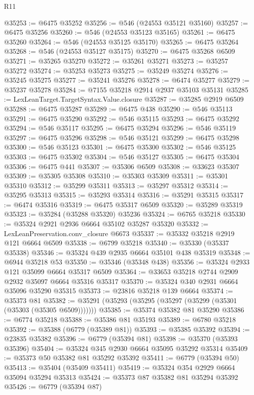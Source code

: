 \begin{lexlean}{R11}
\begin{coremodule}
@35253 := @6475 @35252
@35256 := @546 (@24553 @35121 @35160)
@35257 := @6475 @35256
@35260 := @546 (@24553 @35123 @35165)
@35261 := @6475 @35260
@35264 := @546 (@24553 @35125 @35170)
@35265 := @6475 @35264
@35268 := @546 (@24553 @35127 @35175)
@35270 := @6475 @35268 @6509
@35271 := @35265 @35270
@35272 := @35261 @35271
@35273 := @35257 @35272
@35274 := @35253 @35273
@35275 := @35249 @35274
@35276 := @35245 @35275
@35277 := @35241 @35276
@35278 := @6474 @35277
@35279 := @35237 @35278
@35284 := @7155 @35218 @2914 @2937 @35103 @35131
@35285 := LexLeanTarget.TargetSyntax.Value.closure
@35287 := @35285 @2919 @6509
@35288 := @6475 @35287
@35289 := @6475 @438
@35290 := @546 @35113
@35291 := @6475 @35290
@35292 := @546 @35115
@35293 := @6475 @35292
@35294 := @546 @35117
@35295 := @6475 @35294
@35296 := @546 @35119
@35297 := @6475 @35296
@35298 := @546 @35121
@35299 := @6475 @35298
@35300 := @546 @35123
@35301 := @6475 @35300
@35302 := @546 @35125
@35303 := @6475 @35302
@35304 := @546 @35127
@35305 := @6475 @35304
@35306 := @6475 @441
@35307 := @35306 @6509
@35308 := @33623 @35307
@35309 := @35305 @35308
@35310 := @35303 @35309
@35311 := @35301 @35310
@35312 := @35299 @35311
@35313 := @35297 @35312
@35314 := @35295 @35313
@35315 := @35293 @35314
@35316 := @35291 @35315
@35317 := @6474 @35316
@35319 := @6475 @35317 @6509
@35320 := @35289 @35319
@35323 := @35284 (@35288 @35320) @35236
@35324 := @6765 @35218
@35330 := @35324 @2921 @2936 @6664 @35102 @35287 @35320
@35332 := LexLeanPreservation.conv_closure @6673
@35337 := @35332 @35218 @2919 @121 @6664 @6509
@35338 := @6799 @35218
@35340 := @35330 (@35337 @35338)
@35346 := @35324 @439 @2935 @6664 @35101 @438 @35319
@35348 := @6944 @35218 @53
@35350 := @35346 (@35348 @438)
@35356 := @35324 @2933 @121 @35099 @6664 @35317 @6509
@35364 := @33653 @35218 @2744 @2909 @2932 @35097 @6664 @35316 @35317
@35370 := @35324 @340 @2931 @6664 @35096 @35290 @35315
@35373 := @23816 @35218 @139 @6664
@35374 := @35373 @81
@35382 := @35291 (@35293 (@35295 (@35297 (@35299 (@35301 (@35303 (@35305 @6509)))))))
@35385 := @35374 @35382 @81 @35290
@35386 := @6774 @35218
@35388 := @35386 @81 @35193
@35389 := @6780 @35218
@35392 := @35388 (@6779 (@35389 @81))
@35393 := @35385 @35392
@35394 := @23835 @35382
@35396 := @6779 (@35394 @81)
@35398 := @35370 (@35393 @35396)
@35404 := @35324 @345 @2930 @6664 @35095 @35292 @35314
@35409 := @35373 @50 @35382 @81 @35292 @35392
@35411 := @6779 (@35394 @50)
@35413 := @35404 (@35409 @35411)
@35419 := @35324 @354 @2929 @6664 @35094 @35294 @35313
@35424 := @35373 @87 @35382 @81 @35294 @35392
@35426 := @6779 (@35394 @87)

\end{coremodule}
\end{lexlean}

